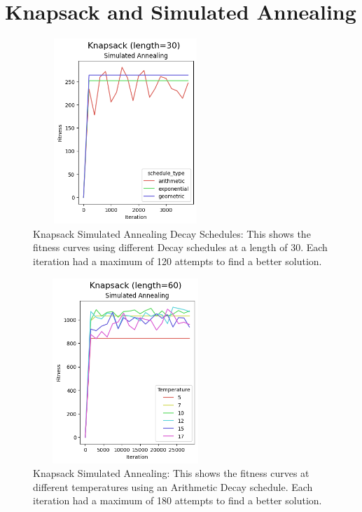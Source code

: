 \documentclass[letterpaper]{article} %
\begin{document}
\section{Knapsack and Simulated Annealing}

\begin{figure}[!htb]
\centering
\includegraphics[width=2.75in, height=2.75in]{figures/Knapsack_length=30_Simulated_Annealing_l_30_ma_120_d_geom__arith__exp_t_10_.png}
\caption{Knapsack Simulated Annealing Decay Schedules: This shows the fitness curves using different Decay schedules at a length of 30. Each iteration had a maximum of 120 attempts to find a better solution. }
\label{fig:knapsack_sa_decay}
\end{figure}

\begin{figure}[!htb]
\centering
\includegraphics[width=2.75in, height=2.75in]{figures/Knapsack_length=60_Simulated_Annealing_l_60_ma_180_d_arith_t_5__7__10__12__15__17_.png}
\caption{Knapsack Simulated Annealing: This shows the fitness curves at different temperatures using an Arithmetic Decay schedule. Each iteration had a maximum of 180 attempts to find a better solution. }
\label{fig:knapsack_sa}
\end{figure}
\end{document}
